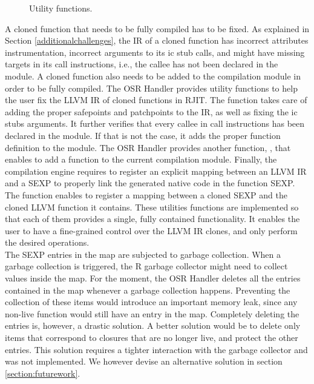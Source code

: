 \begin{figure}[h]
\caption{Utility functions.}
\label{fig:utilityfunctions}
\end{figure}

A cloned function that needs to be fully compiled has to be fixed.
As explained in Section \ref{additionalchallenges}, the IR of a cloned function has incorrect attributes instrumentation, incorrect arguments to its ic stub calls, and might have missing targets in its call instructions, i.e., the callee has not been declared in the module.
A cloned function also needs to be added to the compilation module in order to be fully compiled.
The OSR Handler provides utility functions to help the user fix the LLVM IR of cloned functions in RJIT. 
The  function takes care of adding the proper safepoints and patchpoints to the IR, as well as fixing the ic stubs arguments.
It further verifies that every callee in call instructions has been declared in the module. 
If that is not the case, it adds the proper function definition to the module.
The OSR Handler provides another function, , that enables to add a function to the current compilation module.
Finally, the compilation engine requires to register an explicit mapping between an LLVM IR and a SEXP to properly link the generated native code in the function SEXP.
The  function enables to register a mapping between a cloned SEXP and the cloned LLVM function it contains.
These utilities functions are implemented so that each of them provides a single, fully contained functionality. 
It enables the user to have a fine-grained control over the LLVM IR clones, and only perform the desired operations.\\

The SEXP entries in the  map are subjected to garbage collection.
When a garbage collection is triggered, the R garbage collector might need to collect values inside the map.
For the moment, the OSR Handler deletes all the entries contained in the map whenever a garbage collection happens.
Preventing the collection of these items would introduce an important memory leak, since any non-live function would still have an entry in the map.
Completely deleting the entries is, however, a drastic solution.
A better solution would be to delete only items that correspond to closures that are no longer live, and protect the other entries.
This solution requires a tighter interaction with the garbage collector and was not implemented. 
We however devise an alternative solution in section \ref{section:futurework}.\\

